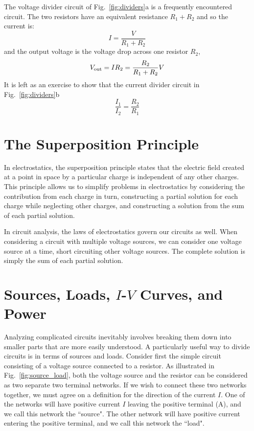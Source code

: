 \documentclass[12pt,oneside]{book}
\begin{document}
The voltage divider circuit of Fig.~\ref{fig:dividers}a is a frequently encountered circuit.  The two resistors have an equivalent resistance $R_1 + R_2$ and so the current is:
\begin{displaymath}
I = \frac{V}{R_1 + R_2} 
\end{displaymath}
and the output voltage is the voltage drop across one resistor $R_2$, 
\begin{displaymath}
V_{\rm out} = I R_2 = \frac{R_2}{R_1 + R_2} V
\end{displaymath}
It is left as an exercise to show that the current divider circuit in Fig.~\ref{fig:dividers}b 
\begin{equation} \label{eqn:idivider}
\frac{I_1}{I_2} = \frac{R_2}{R_1}
\end{equation}

\section{The Superposition Principle}

In electrostatics, the superposition principle states that the electric field created at a point in space by a particular charge is independent of any other charges.  This principle allows us to simplify problems in electrostatics by considering the contribution from each charge in turn, constructing a partial solution for each charge while neglecting other charges, and constructing a solution from the sum of each partial solution.

In circuit analysis, the laws of electrostatics govern our circuits as well.  When considering a circuit with multiple voltage sources, we can consider one voltage source at a time, short circuiting other voltage sources.  The complete solution is simply the sum of each partial solution.

\section{Sources, Loads, $I$-$V$ Curves, and Power}

Analyzing complicated circuits inevitably involves breaking them down into smaller parts that are more easily understood.   A particularly useful way to divide circuits is in terms of sources and loads.  Consider first the simple circuit consisting of a voltage source connected to a resistor.  As illustrated in Fig.~\ref{fig:source_load}, both the voltage source and the resistor can be considered as two separate two terminal networks.  If we wish to connect these two networks together, we must agree on a definition for the direction of the current $I$.  One of the networks will have positive current $I$ leaving the positive terminal (A), and we call this network the ``source".  The other network will have positive current entering the positive terminal, and we call this network the ``load".  
\end{document}
